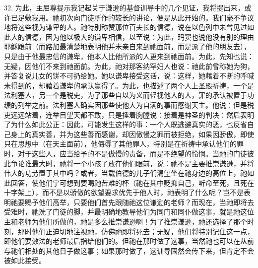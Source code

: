 32. 为此，主屈尊提示我记起关于谦逊的基督训导中的几个见证，我将提出来，或许已足敷我用。祂初次向门徒所作的较长的讲论，便是从此开始的。我们毫不争议地将这些视为谦卑的人。祂特别称赞那位百夫长的信德，说在以色列中未曾见过如此大的信德，因为他以极大的谦卑相信，以至说：为此，玛窦也说他没有别的理由耶稣跟前（而路加最清楚地表明他并未亲自来到祂面前，而是派了他的朋友去），只是由于他最忠信的谦卑，他本人比他所派的人更来到祂面前。为此，先知也说：无疑，因他们不来到祂面前。为此，祂对那客纳罕妇人也说：祂此前曾称她为狗，并答复说儿女的饼不可扔给她。她以谦卑接受这话，说：这样，她藉着不断的呼喊未得到的，却藉着谦卑的承认赢得了。为此，也描述了两个人上圣殿祈祷，一个是法利塞人，另一个是税吏，为了那些自以为义而轻视他人的人，罪的承认被置于功绩的列举之前。法利塞人确实因那些使他大为自满的事而感谢天主。他说：但是税吏远远站着，连举目望天都不敢，只是捶着胸膛说：接着是神圣的判决：然后表明了为什么如此公正：因此，可能发生这样的事：一个人既逃避真实的恶，也反省自己身上的真实善，并为这些善而感谢，却因傲慢之罪而被拒绝，如果因骄傲，即使只在思想中（在天主面前），他侮辱了其他罪人，特别是在祈祷中承认他们的罪时，对于这些人，应当给予的不是傲慢的责备，而是不绝望的怜悯。当祂的门徒彼此争论谁最大时，祂将一个小孩子放在他们眼前，说：祂不是主要推崇谦逊，并将伟大的功劳置于其中吗？或者，当载伯德的儿子们渴望坐在祂身边的高位上，祂如此回答，使他们宁可想到要喝祂苦难的杯（祂在其中贬抑自己，听命至死，且死在十字架上），而不是以骄傲的欲望要求优先于他人时，祂表明了什么呢？岂不是表明祂要赐予他们高举，只要他们首先跟随祂这位谦逊的老师？而现在，当祂即将去受难时，祂洗了门徒的脚，并最明确地教导他们为同门和同仆做这事，就是祂这位主和老师为他们所做的，祂是多么推崇谦逊啊！为了推崇谦逊，祂还选择了那个时刻，那时他们正迫切地注视祂，仿佛祂即将死去；无疑，他们将特别记住这一点，即他们要效法的老师最后指给他们的。但祂在那时做了这事，当然祂也可以在从前与祂们相处的其他日子做这事；如果那时做了，这训导固然会传下来，但肯定不会被如此接受。\par

